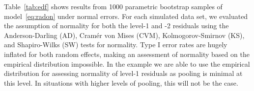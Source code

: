 \documentclass{article} %
\begin{document}
Table~\ref{tab:edf} shows results from 1000 parametric bootstrap samples of model~\ref{eq:radon} under normal errors.
For each simulated data set, we evaluated the assumption of normality for both the level-1 and -2 residuals using the Anderson-Darling (AD), Cram{\'e}r von Mises (CVM),  Kolmogorov-Smirnov (KS), and Shapiro-Wilks (SW) tests for normality.  
Type I error rates are hugely inflated for both random effects, making an assessment of normality based on the empirical distribution impossible.
In the example we are able to use  the empirical distribution for assessing normality of  level-1 residuals  as  pooling is minimal at this level. In situations with higher levels of pooling, this will not be the case.
\end{document}
